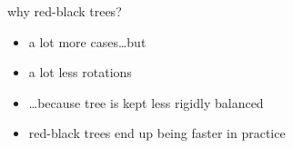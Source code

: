 \begin{frame}{why red-black trees?}
\begin{itemize}
\item a lot more cases\ldots but
\item a lot less rotations
\item \ldots because tree is kept less rigidly balanced
\vspace{.5cm}
\item red-black trees end up being faster in practice
\end{itemize}
\end{frame}

